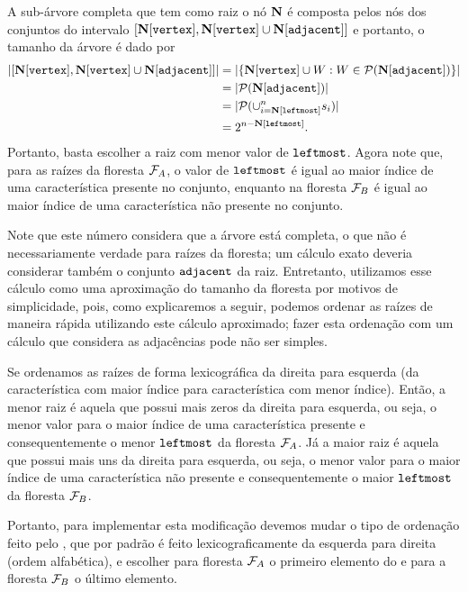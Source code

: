 A sub-árvore completa que tem como raiz o nó $\mathbf N$ é composta 
pelos nós dos conjuntos do intervalo 
$[\mathbf N[\texttt{vertex}], \mathbf N[\texttt{vertex}] \cup \mathbf N[\texttt{adjacent}]]$ e 
portanto, o tamanho da árvore é dado por
\begin{subequations}
\begin{align*}
|[\mathbf N[\texttt{vertex}], \mathbf N[\texttt{vertex}] \cup \mathbf N[\texttt{adjacent}]]| &= 
|\{\mathbf N[\texttt{vertex}] \cup W : W \in \mathcal{P} (\mathbf N[\texttt{adjacent}])\}| \\
    &= |\mathcal{P}(\mathbf N[\texttt{adjacent}])| \\
    &= |\mathcal{P}(\cup_{i = \mathbf N[\texttt{leftmost}]}^{n} s_i)| \\
    &= 2^{n - \mathbf N[\texttt{leftmost}]}.
\end{align*}
\end{subequations}
Portanto, basta escolher a raiz com menor valor de $\texttt{leftmost}$.
Agora note que, para as raízes da floresta $\mathcal{F}_A$, o valor de 
$\texttt{leftmost}$ é igual ao maior índice de uma característica
presente no conjunto, enquanto na floresta $\mathcal{F}_B$ é igual ao maior
índice de uma característica não presente no conjunto.

Note que este número considera que a árvore está completa, o que não é
necessariamente verdade para raízes da floresta; um cálculo exato 
deveria considerar também o conjunto $\texttt{adjacent}$ da raiz. 
Entretanto, utilizamos esse cálculo como uma aproximação do tamanho da 
floresta por motivos de simplicidade, pois, como explicaremos a seguir,
podemos ordenar as raízes de maneira rápida utilizando este cálculo 
aproximado; fazer esta ordenação com um cálculo que considera as 
adjacências pode não ser simples.

Se ordenamos as raízes de forma lexicográfica da direita
para esquerda (da característica com maior índice para característica
com menor índice). Então, a menor raiz é aquela que possui mais zeros
da direita para esquerda, ou seja, o menor valor para o maior índice
de uma característica presente e consequentemente o menor 
$\texttt{leftmost}$ da floresta $\mathcal{F}_A$. Já a maior raiz é aquela 
que possui mais uns da direita para esquerda, ou seja, o menor valor 
para o maior índice de uma característica não presente e 
consequentemente o maior $\texttt{leftmost}$ da floresta $\mathcal{F}_B$.

Portanto, para implementar esta modificação devemos mudar o tipo de
ordenação feito pelo , que por padrão é feito 
lexicograficamente da esquerda para direita (ordem alfabética), e 
escolher para floresta $\mathcal{F}_A$ o primeiro elemento do 
e para a floresta $\mathcal{F}_B$ o último elemento.


